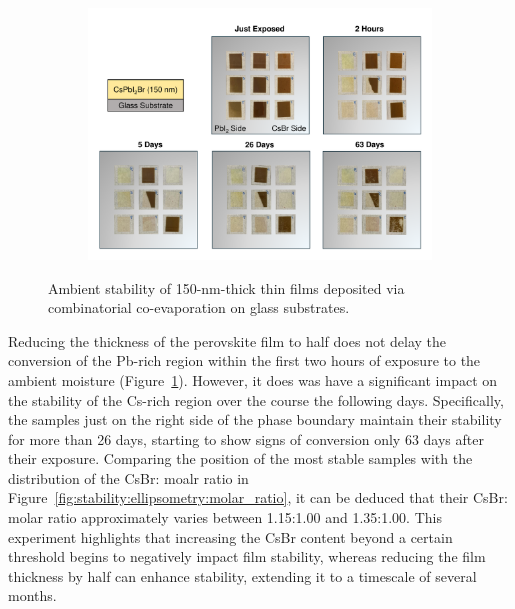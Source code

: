 \begin{figure}[htbp]
    \centering
    \begin{subfigure}[t]{0.99\textwidth}
        \centering
        \includegraphics[width=\textwidth]{chapters/stability/imeges/Stability_No_Rotation_139nm_on_glass.pdf} %
    \end{subfigure}

    \caption[Ambient stability of 150-nm-thick  thin films deposited via combinatorial co-evaporation on glass substrates.]{Ambient stability of 150-nm-thick  thin films deposited via combinatorial co-evaporation on glass substrates.}
    \label{fig:stability:no_rotation:150nm_glass}
\end{figure}

Reducing the thickness of the perovskite film to half does not delay the conversion of the Pb-rich region within the first two hours of exposure to the ambient moisture (Figure~\ref{fig:stability:no_rotation:150nm_glass}). However, it does was have a significant impact on the stability of the Cs-rich region over the course the following days. Specifically, the samples just on the right side of the phase boundary maintain their stability for more than 26 days, starting to show signs of conversion only 63 days after their exposure. Comparing the position of the most stable samples with the distribution of the CsBr: moalr ratio in Figure~\ref{fig:stability:ellipsometry:molar_ratio}, it can be deduced that their CsBr: molar ratio approximately varies between 1.15:1.00 and 1.35:1.00. This experiment highlights that increasing the CsBr content beyond a certain threshold begins to negatively impact film stability, whereas reducing the film thickness by half can enhance stability, extending it to a timescale of several months.

